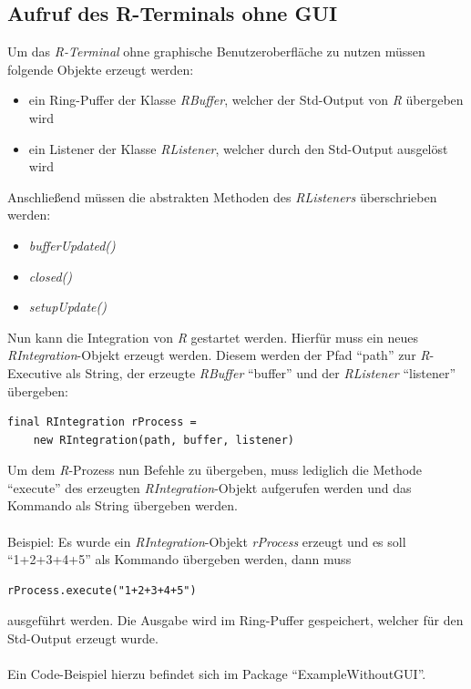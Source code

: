 \documentclass[a4paper, 12pt]{report} %
\begin{document}
\subsection{Aufruf des R-Terminals ohne GUI} \label{BeispielOhneGUI}

Um das \textit{R-Terminal} ohne graphische Benutzeroberfläche zu nutzen müssen folgende Objekte erzeugt werden:
\begin{itemize}
	\item ein Ring-Puffer der Klasse \textit{RBuffer}, welcher der Std-Output von \textit{R} übergeben wird
	\item ein Listener der Klasse \textit{RListener}, welcher durch den Std-Output ausgelöst wird
\end{itemize}
	
Anschließend müssen die abstrakten Methoden des \textit{RListeners} überschrieben werden:
	\begin{itemize}
		\item \textit{bufferUpdated()}
		\item \textit{closed()}
		\item \textit{setupUpdate()}
	\end{itemize}

Nun kann die Integration von \textit{R} gestartet werden. Hierfür muss ein neues \textit{RIntegration}-Objekt erzeugt werden. Diesem werden der Pfad "`path"' zur \textit{R}-Executive als String, der erzeugte \textit{RBuffer} "`buffer"' und der \textit{RListener} "`listener"' übergeben:

\lstset{language=Java}
\begin{lstlisting}[frame=single]
final RIntegration rProcess = 
	new RIntegration(path, buffer, listener)	
\end{lstlisting}

Um dem \textit{R}-Prozess nun Befehle zu übergeben, muss lediglich die Methode "`execute"' des erzeugten \textit{RIntegration}-Objekt aufgerufen werden und das Kommando als String übergeben werden.\\
\\
Beispiel: Es wurde ein \textit{RIntegration}-Objekt \textit{rProcess} erzeugt und es soll "`1+2+3+4+5"' als Kommando übergeben werden, dann muss

\lstset{language=Java}
\begin{lstlisting}[frame=single]
rProcess.execute("1+2+3+4+5")	
\end{lstlisting}
ausgeführt werden. Die Ausgabe wird im Ring-Puffer gespeichert, welcher für den Std-Output erzeugt wurde.\\
\\
Ein Code-Beispiel hierzu befindet sich im Package "`ExampleWithoutGUI"'.
\end{document}

